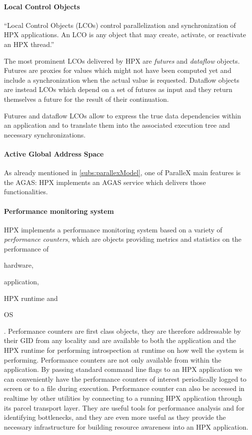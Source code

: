 \paragraph{Local Control Objects}
``Local Control Objects (LCOs) control parallelization and synchronization of
HPX applications. An LCO is any object that may create, activate, or reactivate
an HPX thread.''\cite{grubel2016dynamic}

The most prominent LCOs delivered by HPX are \emph{futures} and \emph{dataflow} objects. Futures are proxies for values which might not have been computed yet and include a synchronization when the actual value is requested. Dataflow objects are instead LCOs which depend on a set of futures as input and they return themselves a future for the result of their continuation.

Futures and dataflow LCOs allow to express the true data dependencies within an application and to translate them into the associated execution tree and necessary synchronizations.

\paragraph{Active Global Address Space}
As already mentioned in \ref{subs:parallexModel}, one of ParalleX main features is the AGAS: HPX implements an AGAS service which delivers those functionalities.

\paragraph{Performance monitoring system}
HPX implements a performance monitoring system based on a variety of \emph{performance counters}, which are objects providing metrics and statistics on the performance of
\begin{enumerate*}[label={(\roman*)}]
	\item hardware,
	\item application,
	\item HPX runtime and
	\item OS
\end{enumerate*}.
Performance counters are first class objects, they are therefore addressable by their GID from any locality and are available to both the application and the HPX runtime for performing introspection at runtime on how well the system is performing.\cite{kaiser2014hpx}
Performance counters are not only available from within the application. By passing standard command line flags to an HPX application we can conveniently have the performance counters of interest periodically logged to screen or to a file during execution. Performance counter can also be accessed in realtime by other utilities by connecting to a running HPX application through its parcel transport layer\cite{kaiser2014hpx}.
They are useful tools for performance analysis and for identifying bottlenecks, and they are even more useful as they provide the necessary infrastructure for building resource awareness into an HPX application\cite{grubel2016using}.


